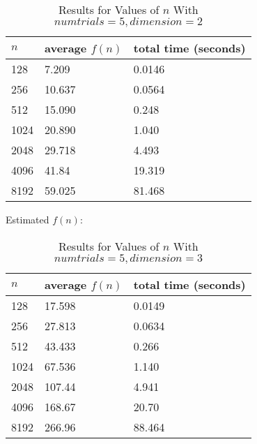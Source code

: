 \documentclass[11pt]{article}
\begin{document}
	\begin{table}[h]
		\centering
		\caption{Results for Values of $n$ With $numtrials = 5, dimension = 2$}
		\begin{tabular}{lll}
			$n$                         & average $f(n)$                        & total time (seconds)                        \\ \hline
			\multicolumn{1}{|l|}{128} & \multicolumn{1}{l|}{7.209} & \multicolumn{1}{l|}{0.0146} \\ \hline
			\multicolumn{1}{|l|}{256}    & \multicolumn{1}{l|}{10.637}       & \multicolumn{1}{l|}{0.0564}       \\ \hline
			\multicolumn{1}{|l|}{512}    & \multicolumn{1}{l|}{15.090}       & \multicolumn{1}{l|}{0.248}       \\ \hline
			\multicolumn{1}{|l|}{1024}    & \multicolumn{1}{l|}{20.890}       & \multicolumn{1}{l|}{1.040}       \\ \hline
			\multicolumn{1}{|l|}{2048}    & \multicolumn{1}{l|}{29.718}       & \multicolumn{1}{l|}{4.493}       \\ \hline
			\multicolumn{1}{|l|}{4096}    & \multicolumn{1}{l|}{41.84}       & \multicolumn{1}{l|}{19.319}       \\ \hline
			\multicolumn{1}{|l|}{8192}    & \multicolumn{1}{l|}{59.025}       & \multicolumn{1}{l|}{81.468}       \\ \hline
		\end{tabular}
	\end{table}
	Estimated $f(n)$: 
	\newpage
	\begin{table}[h]
		\centering
		\caption{Results for Values of $n$ With $numtrials = 5, dimension = 3$}
		\begin{tabular}{lll}
			$n$                         & average $f(n)$                        & total time (seconds)                        \\ \hline
			\multicolumn{1}{|l|}{128} & \multicolumn{1}{l|}{17.598} & \multicolumn{1}{l|}{0.0149} \\ \hline
			\multicolumn{1}{|l|}{256}    & \multicolumn{1}{l|}{27.813}       & \multicolumn{1}{l|}{0.0634}       \\ \hline
			\multicolumn{1}{|l|}{512}    & \multicolumn{1}{l|}{43.433}       & \multicolumn{1}{l|}{0.266}       \\ \hline
			\multicolumn{1}{|l|}{1024}    & \multicolumn{1}{l|}{67.536}       & \multicolumn{1}{l|}{1.140}       \\ \hline
			\multicolumn{1}{|l|}{2048}    & \multicolumn{1}{l|}{107.44}       & \multicolumn{1}{l|}{4.941}       \\ \hline
			\multicolumn{1}{|l|}{4096}    & \multicolumn{1}{l|}{168.67}       & \multicolumn{1}{l|}{20.70}       \\ \hline
			\multicolumn{1}{|l|}{8192}    & \multicolumn{1}{l|}{266.96}       & \multicolumn{1}{l|}{88.464}       \\ \hline
		\end{tabular}
	\end{table}
\end{document}
